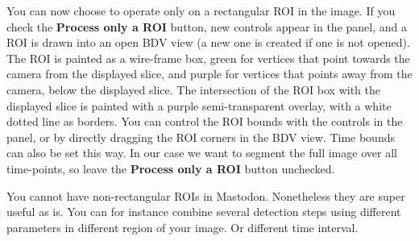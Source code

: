 You can now choose to operate only on a rectangular ROI in the image. 
If you check the \textbf{Process only a ROI} button, new controls appear in the panel, and a ROI is drawn into an open BDV view (a new one is created if one is not opened).
The ROI is painted as a wire-frame box, green for vertices that point towards the camera from the displayed slice, and purple for vertices that points away from the camera, below the displayed slice.
The intersection of the ROI box with the displayed slice is painted with a purple semi-transparent overlay, with a white dotted line as borders.
You can control the ROI bounds with the controls in the panel, or by directly dragging the ROI corners in the BDV view.
Time bounds can also be set this way. In our case we want to segment the full image over all time-points, so leave the \textbf{Process only a ROI} button unchecked.

You cannot have non-rectangular ROIs in Mastodon. Nonetheless they are super useful as is. 
You can for instance combine several detection steps using different parameters in different region of your image. Or different time interval.

